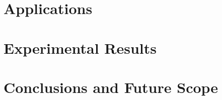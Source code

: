 \documentclass[a4paper, oneside, 12pt]{report}
\begin{document}
\chapter{Applications}
\label{chap:app}

% 
\chapter{Experimental Results}

% 
 
\chapter{Conclusions and Future Scope}


\clearpage
{}


\end{document}
